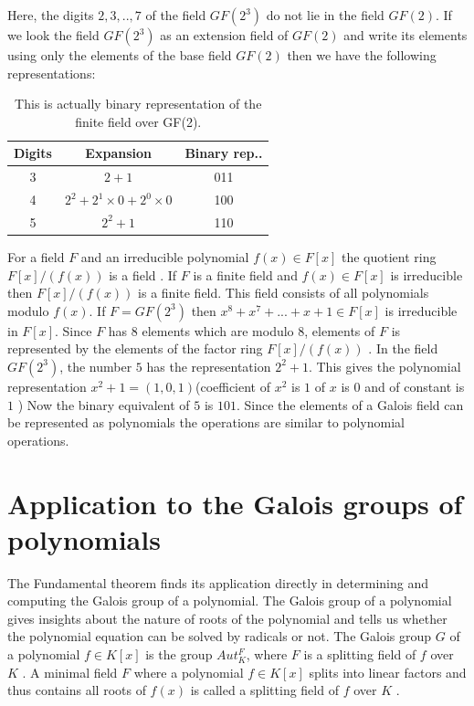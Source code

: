 \documentclass[a4paper,twoside,10pt]{article}
\theoremstyle{plain}
\theoremstyle{definition}
\begin{document}
Here, the digits \(2,3,..,7\) of the field \(GF(2^3)\) do not lie in the field \(GF(2)\). If we look the field \(GF(2^3)\) as an extension field of \(GF(2)\) and write its elements using only the elements of the base field \(GF(2)\) then we have the following representations:
\begin{table}[h!]
  \centering
\begin{tabular}{|c|c|c|}
    \hline
    Digits & Expansion & Binary rep..\\
    \hline
    3 & \(2+1\) & 011 \\
    4 & \(2^2+2^1 \times 0 +2^0 \times 0\) & 100 \\
    5 & \(2^2+1\) & 110 \\
    \hline
\end{tabular}
\caption{\small This is actually binary representation of the finite field over GF(2).}
\end{table}

\noindent
For a field \(F\) and an irreducible polynomial \(f(x) \in F[x]\) the quotient ring \(F[x]/(f(x))\) is a field \cite{galois}. If \(F\) is a finite field and \(f(x) \in F[x]\) is irreducible then \(F[x]/(f(x))\) is a finite field. This field consists of all polynomials modulo \(f(x)\). If \(F=GF(2^3)\) then \(x^8+x^7+...+x+1 \in F[x]\) is irreducible in \(F[x]\). Since \(F\) has \(8\) elements which are modulo \(8\), elements of \(F\) is represented by the elements of the factor ring \(F[x]/(f(x))\) \cite{aes}. In the field \(GF(2^3)\), the number \(5\) has the representation \(2^2+1\). This gives the polynomial representation \(x^2+1=(1,0,1)\)(coefficient of \(x^2\) is \(1\) of \(x\) is \(0\) and of constant is \(1\) ) Now the binary equivalent of \(5\) is \(101\). Since the elements of a Galois field can be represented as polynomials the operations are similar to polynomial operations.


\section{Application to the Galois groups of polynomials}
The Fundamental theorem finds its application directly in determining and computing the Galois group of a polynomial. The Galois group of a polynomial gives insights about the nature of roots of the polynomial and tells us whether the polynomial equation can be solved by radicals or not. The Galois group \(G\) of a polynomial \(f \in K[x]\) is the group \(Aut_K^F\), where \(F\) is a splitting field of \(f\) over \(K\) \cite{hunger}. A minimal field \(F\) where a polynomial \(f \in K[x]\) splits into linear factors and thus contains all roots of \(f(x)\) is called a splitting field of \(f\) over \(K\) \cite{hunger}.\\
\end{document}
